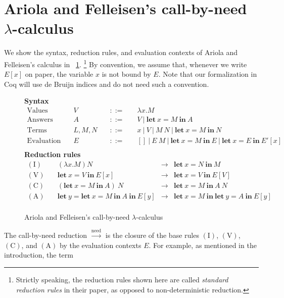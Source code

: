 \documentclass{llncs}
\newcommand{\LET}[3]{\mathbf{let}~#1=#2~\mathbf{in}~#3}
\newcommand{\CALLBYNEED}{\xrightarrow{\mathrm{need}}}
\begin{document}
\section{Ariola and Felleisen's call-by-need $\lambda$-calculus}\label{sec:call-by-need}
%
We show the syntax, reduction rules, and evaluation contexts of Ariola and Felleisen's calculus in \figurename~\ref{call-by-need-lambda-calculus}.%
\footnote{Strictly speaking, the reduction rules shown here are called \emph{standard reduction rules} in their paper, as opposed to non-deterministic reduction. }
By convention, we assume that, whenever we write $E[x]$ on paper, the variable $x$ is not bound by $E$.  Note that our formalization in Coq will use de Bruijn indices and do not need such a convention.
%
\begin{figure}[tp]
	\textbf{Syntax}
	\[ \begin{array}{llcl}
		\mbox{Values}\quad & V\quad & ::=\quad & \lambda x.M \\
		\mbox{Answers}\quad & A\quad & ::=\quad & V~|~\LET{x}{M}{A} \\
		\mbox{Terms}\quad & L,M,N\quad & ::=\quad & x~|~V~|~M~N~|~\LET{x}{M}{N} \\
		\mbox{Evaluation contexts}\quad & E\quad & ::=\quad & [] ~|~ E~M ~|~ \LET{x}{M}{E} ~|~ \LET{x}{E}{E'[x]} \\
	\end{array} \]
	\textbf{Reduction rules}
	\[ \begin{array}{lrcl}
		(\mbox{I})\quad & (\lambda x.M)N & \rightarrow & \LET{x}{N}{M} \\
		(\mbox{V})\quad & \LET{x}{V}{E[x]} & \rightarrow & \LET{x}{V}{E[V]} \\
		(\mbox{C})\quad & (\LET{x}{M}{A})~N & \rightarrow & \LET{x}{M}{A~N} \\
		(\mbox{A})\quad & \LET{y}{\LET{x}{M}{A}}{E[y]} & \rightarrow & \LET{x}{M}{\LET{y}{A}{E[y]}} \\
	\end{array} \]
	\caption{Ariola and Felleisen's call-by-need $\lambda$-calculus}
	\label{call-by-need-lambda-calculus}
\end{figure}
%
The call-by-need reduction $\CALLBYNEED$ is the closure of the base rules $(\mbox{I})$, $(\mbox{V})$, $(\mbox{C})$, and $(\mbox{A})$ by the evaluation contexts $E$.
For example, as mentioned in the introduction, the term
\end{document}
